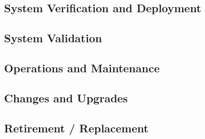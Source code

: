 \subsection{System Verification and Deployment}
\subsection{System Validation}
\subsection{Operations and Maintenance}
\subsection{Changes and Upgrades}
\subsection{Retirement / Replacement}












